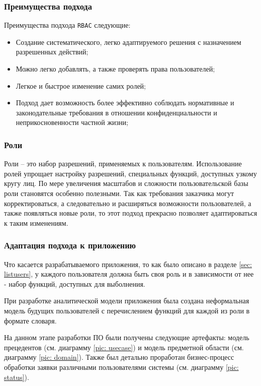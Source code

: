 \documentclass[a4paper,12pt,reqno]{article}
\begin{document}
\subsubsection*{Преимущества подхода}
Преимущества подхода \texttt{RBAC} следующие:

\begin{itemize}
    \item Создание систематического, легко адаптируемого решения с назначением разрешенных действий;
    \item Можно легко добавлять, а также проверять права пользователей;
    \item Легкое и быстрое изменение самих ролей;
    \item Подход дает возможность более эффективно соблюдать нормативные и законодательные требования в отношении конфиденциальности и неприкосновенности частной жизни;
\end{itemize}

\subsubsection*{Роли}

Роли -- это набор разрешений, применяемых к пользователям. Использование ролей упрощает настройку разрешений, специальных функций, доступных узкому кругу лиц. По мере увеличения масштабов и сложности пользовательской базы роли становятся особенно полезными. Так как требования заказчика могут корректироваться, а следовательно и расширяться возможности пользователей, а также появляться новые роли, то этот подход прекрасно позволяет адаптироваться к таким изменениям.


\subsubsection*{Адаптация подхода к приложению}

Что касается разрабатываемого приложения, то как было описано в разделе \ref{sec: listusers}, у каждого пользователя должна быть своя роль и в зависимости от нее - набор функций, доступных для выболнения. 

При разработке аналитической модели приложения была создана неформальная модель будущих пользователей с перечислением функций для каждой из роли в формате словаря. 


На данном этапе разработки ПО были получены следующие артефакты: модель прецедентов (см. диаграмму \ref{pic: usecase}) и модель предметной области (см. диаграмму \ref{pic: domain}). Также был детально проработан бизнес-процесс обработки заявки различными пользователями системы (см. диаграмму \ref{pic: status}).   
\end{document}
